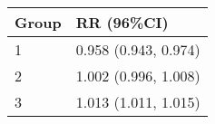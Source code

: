 \begin{tabular}{ll}
  \hline
Group & RR (96\%CI) \\ 
  \hline
   1 & 0.958 (0.943, 0.974) \\ 
     2 & 1.002 (0.996, 1.008) \\ 
     3 & 1.013 (1.011, 1.015) \\ 
   \hline
\end{tabular}

